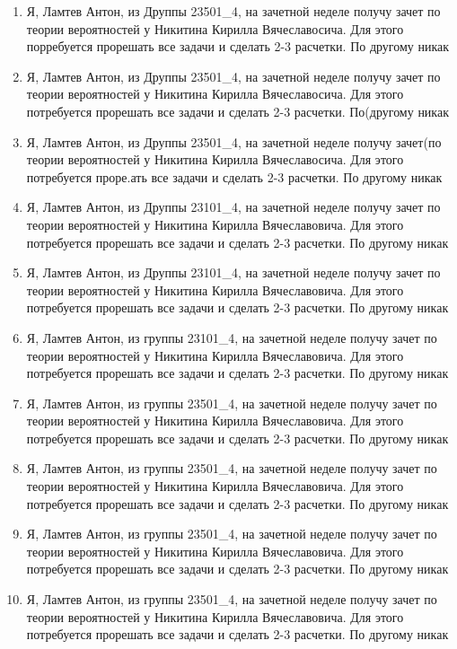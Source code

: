 \begin{itemize}
\begin{enumerate}
		\item
		Я, Ламтев Антон, из Друппы 23501\_4, на зачетной неделе получу зачет по теории вероятностей у Никитина Кирилла Вячеславосича. Для этого порребуется прорешать все задачи и сделать 2-3 расчетки. По другому никак
		\item
		Я, Ламтев Антон, из Друппы 23501\_4, на зачетной неделе получу зачет по теории вероятностей у Никитина Кирилла Вячеславосича. Для этого потребуется прорешать все задачи и сделать 2-3 расчетки. По(другому никак
		\item
		Я, Ламтев Антон, из Друппы 23501\_4, на зачетной неделе получу зачет(по теории вероятностей у Никитина Кирилла Вячеславосича. Для этого потребуется проре.ать все задачи и сделать 2-3 расчетки. По другому никак
		\item
		Я, Ламтев Антон, из Друппы 23101\_4, на зачетной неделе получу зачет по теории вероятностей у Никитина Кирилла Вячеславовича. Для этого потребуется прорешать все задачи и сделать 2-3 расчетки. По другому никак
		\item
		Я, Ламтев Антон, из Друппы 23101\_4, на зачетной неделе получу зачет по теории вероятностей у Никитина Кирилла Вячеславовича. Для этого потребуется прорешать все задачи и сделать 2-3 расчетки. По другому никак
		\item
		Я, Ламтев Антон, из группы 23101\_4, на зачетной неделе получу зачет по теории вероятностей у Никитина Кирилла Вячеславовича. Для этого потребуется прорешать все задачи и сделать 2-3 расчетки. По другому никак
		\item
		Я, Ламтев Антон, из группы 23501\_4, на зачетной неделе получу зачет по теории вероятностей у Никитина Кирилла Вячеславовича. Для этого потребуется прорешать все задачи и сделать 2-3 расчетки. По другому никак
		\item
		Я, Ламтев Антон, из группы 23501\_4, на зачетной неделе получу зачет по теории вероятностей у Никитина Кирилла Вячеславовича. Для этого потребуется прорешать все задачи и сделать 2-3 расчетки. По другому никак
		\item
		Я, Ламтев Антон, из группы 23501\_4, на зачетной неделе получу зачет по теории вероятностей у Никитина Кирилла Вячеславовича. Для этого потребуется прорешать все задачи и сделать 2-3 расчетки. По другому никак
		\item
		Я, Ламтев Антон, из группы 23501\_4, на зачетной неделе получу зачет по теории вероятностей у Никитина Кирилла Вячеславовича. Для этого потребуется прорешать все задачи и сделать 2-3 расчетки. По другому никак
	\end{enumerate}		
	

\end{itemize}

